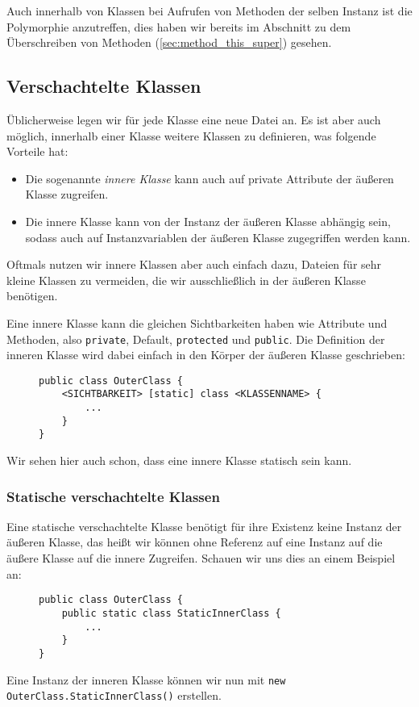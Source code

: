 		Auch innerhalb von Klassen bei Aufrufen von Methoden der selben Instanz ist die Polymorphie anzutreffen, dies haben wir bereits im Abschnitt zu dem Überschreiben von Methoden (\ref{sec:method_this_super}) gesehen.

\subsection{Verschachtelte Klassen}
	\label{sec:classes_nested}
	
	Üblicherweise legen wir für jede Klasse eine neue Datei an. Es ist aber auch möglich, innerhalb einer Klasse weitere Klassen zu definieren, was folgende Vorteile hat:
	\begin{itemize}
		\item Die sogenannte \textit{innere Klasse} kann auch auf private Attribute der äußeren Klasse zugreifen.
		\item Die innere Klasse kann von der Instanz der äußeren Klasse abhängig sein, sodass auch auf Instanzvariablen der äußeren Klasse zugegriffen werden kann.
	\end{itemize}
	Oftmals nutzen wir innere Klassen aber auch einfach dazu, Dateien für sehr kleine Klassen zu vermeiden, die wir ausschließlich in der äußeren Klasse benötigen.
	
	Eine innere Klasse kann die gleichen Sichtbarkeiten haben wie Attribute und Methoden, also \lstinline|private|, Default, \lstinline|protected| und \lstinline|public|. Die Definition der inneren Klasse wird dabei einfach in den Körper der äußeren Klasse geschrieben:
	\begin{figure}[H]
		\centering
		\begin{lstlisting}
public class OuterClass {
	<SICHTBARKEIT> [static] class <KLASSENNAME> {
		...
	}
}
\end{lstlisting}
	\end{figure}
	Wir sehen hier auch schon, dass eine innere Klasse statisch sein kann.
	
	\subsubsection{Statische verschachtelte Klassen}
		Eine statische verschachtelte Klasse benötigt für ihre Existenz keine Instanz der äußeren Klasse, das heißt wir können ohne Referenz auf eine Instanz auf die äußere Klasse auf die innere Zugreifen. Schauen wir uns dies an einem Beispiel an:
		\begin{figure}[H]
			\centering
			\begin{lstlisting}
public class OuterClass {
	public static class StaticInnerClass {
		...
	}
}
\end{lstlisting}
		\end{figure}
		Eine Instanz der inneren Klasse können wir nun mit \lstinline|new OuterClass.StaticInnerClass()| erstellen.
	
